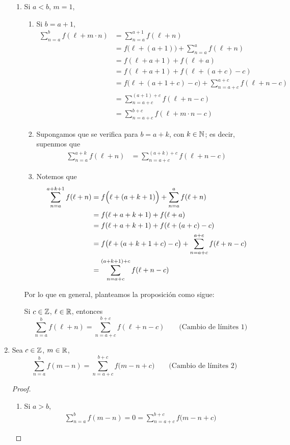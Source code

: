 \begin{enumerate}[label=\alph*)]
\begin{enumerate}[label=\Roman*)]
    \item Si $a<b$, $m=1$,
    \begin{enumerate}[label=\roman*)]
      \item Si $b=a+1$,
      \begin{align*}
        \sum_{n=a}^b f(\ell+m\cdot n) &=\sum_{n=a}^{a+1} f(\ell+n)\\
        &= f\bigl(\ell+ (a+1)\bigr) + \sum_{n=a}^{a} f(\ell+ n)\\
        &= f(\ell+a+1) + f(\ell+a)\\
        &= f(\ell+a+1) + f(\ell +(a+c)-c)\\
        &= f\bigl(\ell+(a+1+c)-c\bigr) + \sum_{n=a+c}^{a+c} f(\ell+ n-c)\\
        &= \sum_{n=a+c}^{(a+1)+c} f(\ell+n-c)\\
        &= \sum_{n=a+c}^{b+c} f(\ell+m\cdot n-c)
      \end{align*}

      \item Supongamos que se verifica para $b=a+k$, con $k\in \mathbb{N}$; es decir, supenmos que
      \begin{align*}
        \sum_{n=a}^{a+k} f(\ell+n) &= \sum_{n=a+c}^{(a+k)+c} f(\ell+n-c)
      \end{align*}

      \item Notemos que
      \begin{align*}
        \sum_{n=a}^{a+k+1} f(\ell+n) &= f\Bigl(\ell+ (a+k+1)\Bigr) + \sum_{n=a}^{a} f(\ell+ n)\\
        &= f(\ell+a+k+1) + f(\ell+a)\\
        &= f(\ell+a+k+1) + f(\ell +(a+c)-c)\\
        &= f\bigl(\ell+(a+k+1+c)-c\bigr) + \sum_{n=a+c}^{a+c} f(\ell+ n-c)\\
        &= \sum_{n=a+c}^{(a+k+1)+c} f(\ell+n-c)
      \end{align*}
    \end{enumerate}


    Por lo que en general, planteamos la proposición como sigue:

    Si $c\in \mathbb{Z}$, $\ell \in \mathbb{R}$, entonces \[\sum_{n=a}^b f(\ell+n) = \sum_{n=a+c}^{b+c} f(\ell+n-c) \qquad \text{(Cambio de límites 1)}\]
    
  \end{enumerate}

  \item Sea $c\in \mathbb{Z}$, $m\in \mathbb{R}$, \[\sum_{n=a}^b f(m-n) = \sum_{n=a+c}^{b+c} f\bigl(m-n+c\bigr) \qquad \text{(Cambio de límites 2)}\]
  \begin{proof}\leavevmode
    \begin{enumerate}[label=\roman*)]
    \item Si $a>b$,
    \begin{align*}
      \sum_{n=a}^b f(m-n) = 0 = \sum_{n=a+c}^{b+c} f\bigl(m-n+c\bigr)
    \end{align*}


\end{enumerate}
\end{proof}
\end{enumerate}
